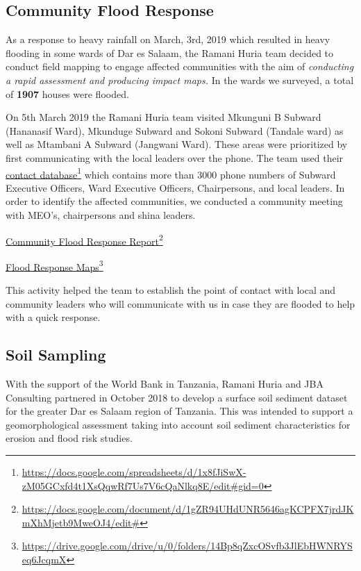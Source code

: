 \documentclass[a4paper,12pt,twoside]{article}
\begin{document}
\begin{multicols}{2}
\subsection{Community Flood Response}
As a response to heavy rainfall on March, 3rd, 2019 which resulted in heavy flooding in some wards of Dar es Salaam, the Ramani Huria team decided to conduct field mapping to engage affected communities with the aim of \textit{conducting a rapid assessment and producing impact maps.} In the wards we surveyed, a total of \textbf{1907} houses were flooded.

On 5th March 2019 the Ramani Huria team visited Mkunguni B Subward (Hananasif Ward), Mkunduge Subward and Sokoni Subward (Tandale ward) as well as Mtambani A Subward (Jangwani Ward). These areas were prioritized by first communicating with the local leaders over the phone. The team used their \href{https://docs.google.com/spreadsheets/d/1x8fJiSwX-zM05GCxfd4t1XsQqwRf7Us7V6cQaNlkq8E/edit#gid=0}{contact database}\footnote{\url{https://docs.google.com/spreadsheets/d/1x8fJiSwX-zM05GCxfd4t1XsQqwRf7Us7V6cQaNlkq8E/edit#gid=0}} which contains more than 3000 phone numbers of Subward Executive Officers, Ward Executive Officers, Chairpersons, and local leaders. In order to identify the affected communities, we conducted a community meeting with MEO’s, chairpersons and shina leaders.

\href{https://docs.google.com/document/d/1gZR94UHdUNR5646agKCPFX7jrdJKmXhMjetb9MweOJ4/edit#}{Community Flood Response Report}\footnote{\url{https://docs.google.com/document/d/1gZR94UHdUNR5646agKCPFX7jrdJKmXhMjetb9MweOJ4/edit#}}

\href{https://drive.google.com/drive/u/0/folders/14Bp8qZxcOSvfb3JlEbHWNRYSeq6JcqmX}{Flood Response Maps}\footnote{\url{https://drive.google.com/drive/u/0/folders/14Bp8qZxcOSvfb3JlEbHWNRYSeq6JcqmX}}

This activity helped the team to establish the point of contact with local and community leaders who will communicate with us in case they are flooded to help with a quick response.


\subsection{Soil Sampling}
With the support of the World Bank in Tanzania, Ramani Huria and JBA Consulting partnered in October 2018 to develop a surface soil sediment dataset for the greater Dar es Salaam region of Tanzania. This was intended to support a geomorphological assessment taking into account soil sediment characteristics for erosion and flood risk studies.



\end{multicols}
\end{document}
